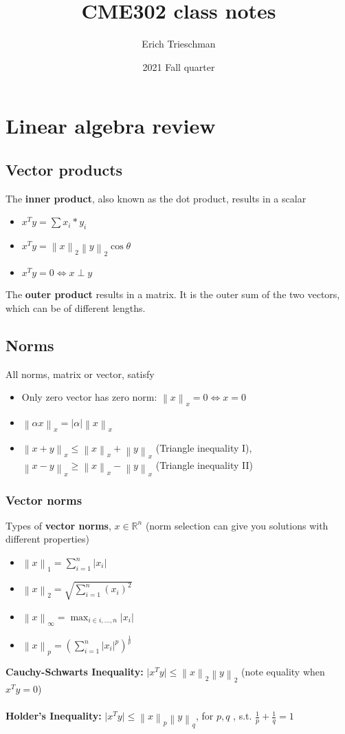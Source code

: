 \documentclass{article}
\title{CME302 class notes}
\author{Erich Trieschman}
\date{2021 Fall quarter}
\newcommand{\norm}[2]{\left\lVert#1\right\rVert_#2}
\newcommand{\abs}[1]{\lvert#1\rvert}
\begin{document}
\maketitle
\tableofcontents

\section{Linear algebra review}

\subsection{Vector products}
The \textbf{inner product}, also known as the dot product, results in a scalar
\begin{itemize}
    \item $x^Ty = \sum x_i*y_i$
    \item $x^Ty = \norm{x}{2}\norm{y}{2}\cos\theta$
    \item $x^Ty = 0 \Leftrightarrow x \perp y$
\end{itemize}
The \textbf{outer product} results in a matrix. It is the outer sum of the two vectors, which can be of different lengths.

\subsection{Norms}
All norms, matrix or vector, satisfy
\begin{itemize}
    \item Only zero vector has zero norm: $\norm{x}{x} = 0 \Leftrightarrow x = 0$
    \item $\norm{\alpha x}{x} = \abs{\alpha}\norm{x}{x}$
    \item $\norm{x+y}{x} \leq \norm{x}{x} + \norm{y}{x}$ (Triangle inequality I), $\norm{x-y}{x} \geq \norm{x}{x} - \norm{y}{x}$ (Triangle inequality II)
\end{itemize}

\subsubsection{Vector norms}
Types of \textbf{vector norms}, $x \in \mathbb{R}^{n}$ (norm selection can give you solutions with different properties)
\begin{itemize}
    \item $\norm{x}{1} = \sum_{i=1}^n \abs{x_i}$
    \item $\norm{x}{2} = \sqrt{\sum_{i=1}^n (x_i)^2}$
    \item $\norm{x}{\infty} = \max_{i \in i,\dots, n} \abs{x_i}$
    \item $\norm{x}{p} = (\sum_{i=1}^n \abs{x_i}^p)^{\frac{1}{p}}$
\end{itemize}
\textbf{Cauchy-Schwarts Inequality:} $\abs{x^Ty}\leq \norm{x}{2}\norm{y}{2}$ (note equality when $x^Ty = 0$)\\ \\
\textbf{Holder's Inequality:} $\abs{x^Ty} \leq \norm{x}{p}\norm{y}{q}$, for $p, q$ , s.t. $\frac{1}{p} + \frac{1}{q} = 1$
\end{document}
